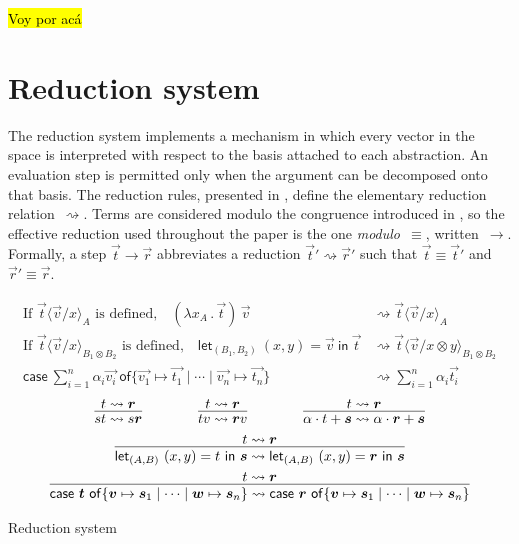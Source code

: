 \documentclass[runningheads,orivec,envcountsame,envcountsect]{llncs}
\newcommand\lra{\longrightarrow}
\newcommand\ansubst[2]{\ensuremath{\langle #1 \rangle_{#2}}}
\def\Pair#1#2{(#1,#2)} %
\def\Lam#1#2#3{\lambda#1_{#2}\,{.}\,#3} %
\def\letkeyword{\mathsf{let}}
\def\inkeyword{\mathsf{in}}
\def\LetP#1#2#3#4#5#6{\letkeyword_{\Pair{#2}{#4}}~\Pair{#1}{#3}=#5~\inkeyword~#6}
\def\gencase#1#2#3#4#5{\ensuremath{\mathsf{case}~#1~\mathsf{of} \{#2\mapsto #4 \mid \dotsb \mid #3\mapsto #5\}}}
\def\lraneq{\rightsquigarrow}
\begin{document}
\bigskip
\hl{Voy por acá}


\section{Reduction system}\label{sec:reduction}

The reduction system implements a mechanism in which every vector in the space
is interpreted with respect to the basis attached to each abstraction. An
evaluation step is permitted only when the argument can be decomposed onto that
basis. The reduction rules, presented in , define the
elementary reduction relation~$\lraneq$. Terms are considered modulo the
congruence introduced in , so the effective reduction used
throughout the paper is the one \emph{modulo~$\equiv$}, written~$\lra$.
Formally, a step $\vec t\lra\vec r$ abbreviates a reduction
$\vec t'\lraneq\vec r'$ such that $\vec t\equiv\vec t'$ and
$\vec r'\equiv\vec r$.

\begin{table*}[t]
  \begin{align*}
    \text{If }\vec{t}\ansubst{\vec v/x}{A}\text{ is defined,}\quad
    (\Lam{x}{A}{\vec{t}})\,\vec{v}
    &\lraneq \vec{t}\ansubst{\vec v/x}{A}\\
    \text{If }\vec{t}\ansubst{\vec v/x}{B_1\otimes B_2}\text{ is defined,}\quad
    \LetP{x}{B_1}{y}{B_2}{\vec v}{\vec{t}}
    &\lraneq \vec{t}\ansubst{\vec{v}/x\otimes y}{B_1\otimes B_2}\\
    \gencase{\sum_{i=1}^{n}\alpha_i \vec{v_i}}{\vec{v_1}}{\vec{v_n}}{\vec{t_1}}{\vec{t_n}}
    &\lraneq \sum_{i=1}^{n}\alpha_i \vec{t_i}
  \end{align*}
  \[
    \begin{array}{c}
      \infer{st\lraneq s\vec r}{t\lraneq \vec r}
      \qquad\qquad
      \infer{tv\lraneq \vec rv}{t\lraneq\vec r}
      \qquad\qquad
      \infer{\alpha\cdot t+\vec s\lraneq\alpha\cdot\vec r+\vec s}{t\lraneq\vec r}
      \\[5pt]
      \infer{\LetP{x}{A}{y}{B}{t}{\vec{s}}\lraneq \LetP{x}{A}{y}{B}{\vec r}{\vec{s}}}{t\lraneq \vec r} 
      \\[5pt]
      \infer{\gencase{\vec t}{\vec v}{\vec w}{\vec s_1}{\vec s_n}\lraneq\gencase{\vec r}{\vec v}{\vec w}{\vec s_1}{\vec s_n}}{t\lraneq \vec r}
    \end{array}
  \]
  \caption{Reduction system}
  \label{tab:Reduction}
\end{table*}
\end{document}
